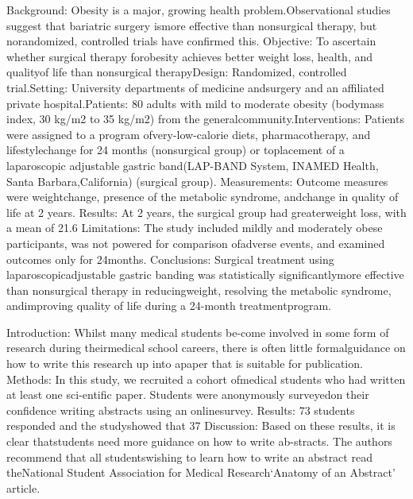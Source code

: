 Background: Obesity is a major, growing health problem.Observational studies suggest that bariatric surgery ismore  effective  than  nonsurgical  therapy,  but  norandomized, controlled trials have confirmed this.
Objective:  To  ascertain  whether  surgical  therapy  forobesity achieves better weight loss, health, and qualityof life than nonsurgical therapyDesign: Randomized, controlled trial.Setting:  University  departments  of  medicine  andsurgery and an affiliated private hospital.Patients: 80 adults with mild to moderate obesity (bodymass index, 30 kg/m2 to 35 kg/m2) from the generalcommunity.Interventions: Patients were assigned to a program ofvery-low-calorie diets, pharmacotherapy, and lifestylechange  for  24  months  (nonsurgical  group)  or  toplacement  of  a  laparoscopic  adjustable  gastric  band(LAP-BAND System, INAMED Health, Santa Barbara,California) (surgical group).
Measurements: Outcome  measures  were  weightchange,  presence  of  the  metabolic  syndrome,  andchange in quality of life at 2 years.
Results:  At  2  years,  the  surgical  group  had  greaterweight loss, with a mean of 21.6%
Limitations: The study included mildly and moderately obese participants, was not powered for comparison ofadverse  events,  and  examined  outcomes  only  for  24months.
Conclusions:  Surgical  treatment  using  laparoscopicadjustable gastric banding was statistically significantlymore  effective  than  nonsurgical  therapy  in  reducingweight,  resolving  the  metabolic  syndrome,  andimproving quality of life during a 24-month treatmentprogram.


Introduction: Whilst many medical students be-come involved in some form of research during theirmedical school careers, there is often little formalguidance on how to write this research up into apaper that is suitable for publication.
Methods: In this study, we recruited a cohort ofmedical students who had written at least one sci-entific paper. Students were anonymously surveyedon their confidence writing abstracts using an onlinesurvey.
Results:  73 students responded and the studyshowed that 37 %
Discussion: Based on these results, it is clear thatstudents need more guidance on how to write ab-stracts. 
The authors recommend that all studentswishing to learn how to write an abstract read theNational Student Association for Medical Research‘Anatomy of an Abstract’ article.

